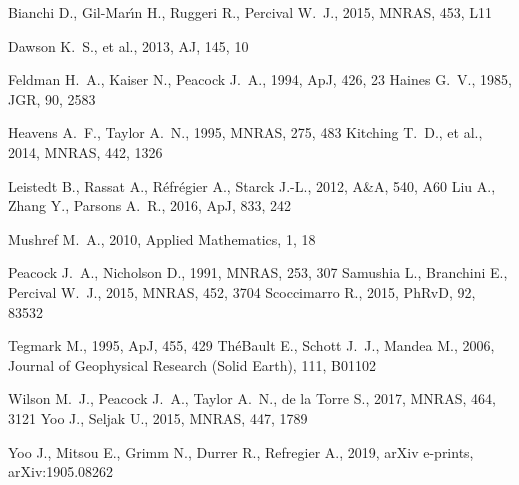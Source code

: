 \documentclass[fleqn,usenatbib]{mnras}
\begin{document}
\begin{thebibliography}{99}
 Bianchi D., Gil-Mar{\'\i}n H., Ruggeri
R., Percival W.~J., 2015, MNRAS, 453, L11

Dawson K.~S., et al., 2013, AJ, 145, 10

 Feldman H.~A., Kaiser N., Peacock J.~A.,
1994, ApJ, 426, 23
 Haines
G.~V., 1985, JGR, 90, 2583

Heavens A.~F., Taylor A.~N., 1995, MNRAS, 275, 483
Kitching T.~D., et al., 2014, MNRAS, 442, 1326

 Leistedt B., Rassat A., R{\'e}fr{\'e}gier
A., Starck J.-L., 2012, A\&A, 540, A60
 Liu A., Zhang Y., Parsons A.~R., 2016,
ApJ, 833, 242

 Mushref M.~A., 2010, Applied
Mathematics, 1, 18

 Peacock J.~A., Nicholson D., 1991,
MNRAS, 253, 307
 Samushia L., Branchini E., Percival
W.~J., 2015, MNRAS, 452, 3704
Scoccimarro R., 2015, PhRvD, 92, 83532

 Tegmark
M., 1995, ApJ, 455, 429
 Th{\'e}Bault E., Schott J.~J., Mandea M.,
2006, Journal of Geophysical Research (Solid Earth), 111, B01102

 Wilson M.~J., Peacock J.~A., Taylor A.~N.,
de la Torre S., 2017, MNRAS, 464, 3121
 Yoo
J., Seljak U., 2015, MNRAS, 447, 1789

 Yoo J., Mitsou E., Grimm N., Durrer R.,
Refregier A., 2019, arXiv e-prints, arXiv:1905.08262
\end{thebibliography}




\appendix



\bsp	%
\label{lastpage}
\end{document}
